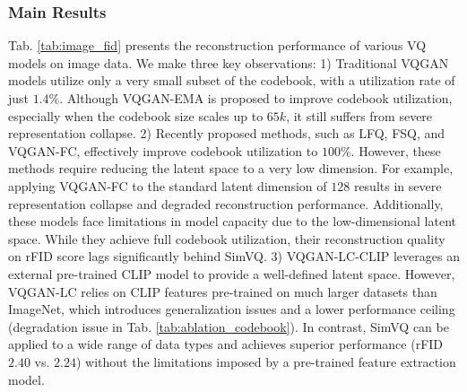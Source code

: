 \subsubsection{Main Results}
Tab. \ref{tab:image_fid} presents the reconstruction performance of various VQ models on image data. We make three key observations: 1) Traditional VQGAN models utilize only a very small subset of the codebook, with a utilization rate of just $1.4\%$. Although VQGAN-EMA is proposed to improve codebook utilization, especially when the codebook size scales up to $65k$, it still suffers from severe representation collapse. 2) Recently proposed methods, such as LFQ, FSQ, and VQGAN-FC, effectively improve codebook utilization to $100\%$. However, these methods require reducing the latent space to a very low dimension. For example, applying VQGAN-FC to the standard latent dimension of $128$ results in severe representation collapse and degraded reconstruction performance. Additionally, these models face limitations in model capacity due to the low-dimensional latent space. While they achieve full codebook utilization, their reconstruction quality on rFID score lags significantly behind SimVQ. 3) VQGAN-LC-CLIP leverages an external pre-trained CLIP model to provide a well-defined latent space. However, VQGAN-LC relies on CLIP features pre-trained on much larger datasets than ImageNet, which introduces generalization issues and a lower performance ceiling (degradation issue in Tab. \ref{tab:ablation_codebook}). In contrast, SimVQ can be applied to a wide range of data types and achieves superior performance (rFID $2.40$ vs. $2.24$) without the limitations imposed by a pre-trained feature extraction model.



